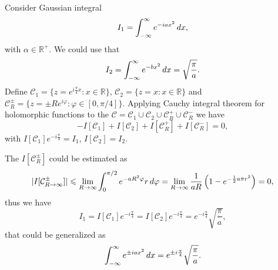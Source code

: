 Consider Gaussian integral 
\begin{equation*}
	I_1 = \int_{-\infty}^{\infty} e^{-i a x^2} \, d x,
\end{equation*}
with $\alpha \in \mathbb{R}^+$. We could use that
\begin{equation*}
	I_2 = \int_{-\infty}^{\infty} e^{-b x^2} \, d x = \sqrt{\frac{\pi}{a}}.
\end{equation*}
Define  $\mathcal C_1 = \{z=e^{i \frac{\pi}{4}x} \colon x \in \mathbb{R}\}$,
$\mathcal C_2 = \{z=x \colon x \in \mathbb{R}\}$ and ${\mathcal C}_R^\pm = \{z = \pm R e^{i \varphi} \colon \varphi \in [0, \pi/4]\}$. Applying Cauchy integral theorem for holomorphic functions to the $\mathcal C = \mathcal C_1 \cup \mathcal C_2 \cup {\mathcal C}_R^+ \cup {\mathcal C}_R^-$ we have 
\begin{equation*}
	-I[\mathcal C_1]+I[\mathcal C_2]+I[{\mathcal C}_R^+]+I[{\mathcal C}_R^-] = 0,
\end{equation*}
with $I[\mathcal C_1] e^{-i \frac{\pi}{4}} = I_1 $, $I[\mathcal C_2] = I_2$.

The $I[{\mathcal C}_R^\pm]$ could be estimated as
\begin{equation*}
	|I[{\mathcal C}_{R \to \infty}^\pm] | \leqslant \lim_{R \to \infty} \int_{0}^{\pi/2} e^{-a R^2 \varphi} r \, d \varphi = \lim_{R \to \infty} \frac{1}{aR}\left(
		1 - e^{- \frac{1}{2} a \pi r^2}
	\right) = 0,
\end{equation*}
thus we have
\begin{equation*}
	I_1 = I[\mathcal C_1] e^{-i \frac{\pi}{4}} =  I[\mathcal C_2] e^{-i \frac{\pi}{4}} = e^{-i \frac{\pi}{4}} \sqrt{\frac{\pi}{a}},
\end{equation*}
that could be generalized as
\begin{equation*}
	\int_{-\infty}^{\infty} e^{\pm i a x^2} \, d x = e^{\pm i \frac{\pi}{4}} \sqrt{\frac{\pi}{a}}.
\end{equation*}


